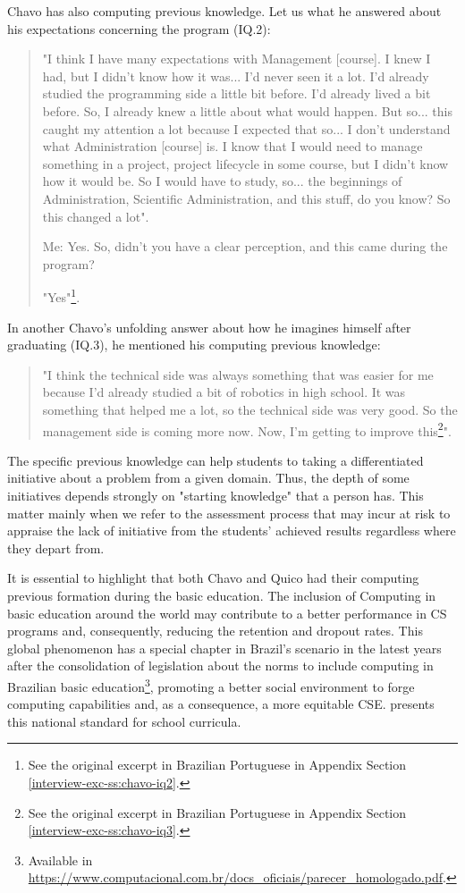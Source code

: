 Chavo has also computing previous knowledge. Let us what he answered about his expectations concerning the program (\gls{IQ}.2):
\begin{quote}
    "I think I have many expectations with Management [course]. I knew I had, but I didn't know how it was... I'd never seen it a lot. I'd already studied the programming side a little bit before. I'd already lived a bit before. So, I already knew a little about what would happen. But so... this caught my attention a lot because I expected that so... I don't understand what Administration [course] is. I know that I would need to manage something in a project, project lifecycle in some course, but I didn't know how it would be. So I would have to study, so... the beginnings of Administration, Scientific Administration, and this stuff, do you know? So this changed a lot".

    \colorbox{black!15}{Me: Yes. So, didn't you have a clear perception, and this came during the program?}
    
    "Yes"\footnote{See the original excerpt in Brazilian Portuguese in Appendix Section \ref{interview-exc-ss:chavo-iq2}.}.
\end{quote}
In another Chavo's unfolding answer about how he imagines himself after graduating (\gls{IQ}.3), he mentioned his computing previous knowledge:
\begin{quote}
    "I think the technical side was always something that was easier for me because I'd already studied a bit of robotics in high school. It was something that helped me a lot, so the technical side was very good. So the management side is coming more now. Now, I'm getting to improve this\footnote{See the original excerpt in Brazilian Portuguese in Appendix Section \ref{interview-exc-ss:chavo-iq3}.}".
\end{quote}

The specific previous knowledge can help students to taking a differentiated initiative about a problem from a given domain. Thus, the depth of some initiatives depends strongly on "starting knowledge" that a person has. This matter mainly when we refer to the assessment process that may incur at risk to appraise the lack of initiative from the students' achieved results regardless where they depart from.

It is essential to highlight that both Chavo and Quico had their computing previous formation during the basic education. The inclusion of Computing in basic education around the world may contribute to a better performance in \gls{CS} programs and, consequently, reducing the retention and dropout rates. This global phenomenon has a special chapter in Brazil's scenario in the latest years after the consolidation of legislation about the norms to include computing in Brazilian basic education\footnote{Available in \url{https://www.computacional.com.br/docs_oficiais/parecer_homologado.pdf}.}, promoting a better social environment to forge computing capabilities and, as a consequence, a more equitable \gls{CSE}.  presents this national standard for school curricula.  

